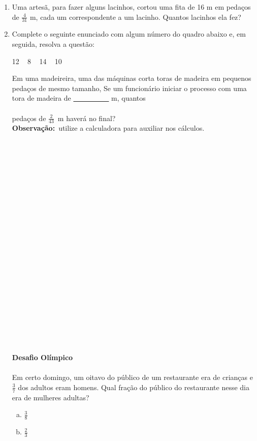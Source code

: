 \documentclass[a4paper,14pt]{article}
\begin{document}
\begin{multicols}{2}
\begin{enumerate}
   			\item Uma artesã, para fazer alguns lacinhos, cortou uma fita de 16 m em pedaços de $\frac{4}{31}$ m, cada um correspondente a um lacinho. Quantos lacinhos ela fez? \newpage
   			\item Complete o seguinte enunciado com algum número do quadro abaixo e, em seguida, resolva a questão:
   			\begin{center} \begin{tcolorbox}[colback=white, colframe=black, boxrule=0.5mm, width=4cm]
   					12 ~ 8 ~ 14 ~ 10
   				\end{tcolorbox}
   			\end{center}
   			Em uma madeireira, uma das máquinas corta toras de madeira em pequenos pedaços de mesmo tamanho, Se um funcionário iniciar o processo com uma tora de madeira de \underline{~~~~~~~~~~} m, quantos \\\\ pedaços de $\frac{2}{43}$~m haverá no final? \\
   			\textbf{Observação:}~utilize a calculadora para auxiliar nos cálculos.
   			\\\\\\\\\\\\\\\\\\\\\\\\\\\\\\\\\\\\\\\\\\\\\\
   			\textbf{Desafio Olímpico} \\\\
   			Em certo domingo, um oitavo do público de um restaurante era de crianças e $\frac{3}{7}$ dos adultos eram homens. Qual fração do público do restaurante nesse dia era de mulheres adultas?
   			\begin{enumerate}[a)]
   				\item $\frac{3}{8}$
   				\item $\frac{2}{3}$

\end{enumerate}
\end{enumerate}
\end{multicols}
\end{document}

